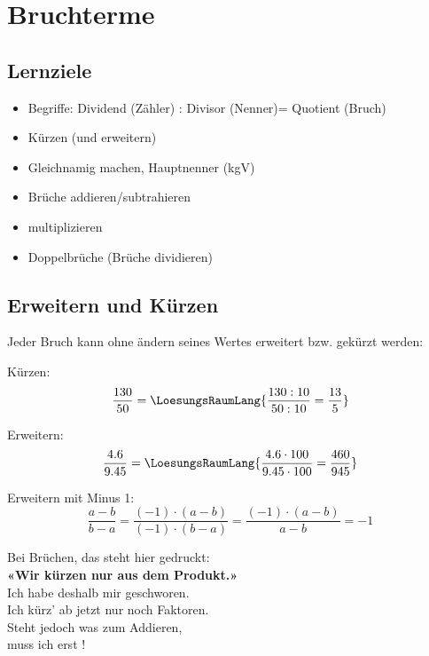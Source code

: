 \newpage
\section{Bruchterme}

\subsection*{Lernziele}

\begin{itemize}
	\item Begriffe: Dividend (Zähler) : Divisor
	(Nenner)= Quotient (Bruch)
  \item Kürzen (und erweitern)
	\item Gleichnamig machen, Hauptnenner (kgV)
	\item Brüche addieren/subtrahieren
  \item multiplizieren
	\item Doppelbrüche (Brüche dividieren) 
\end{itemize}

\newpage

\subsection{Erweitern und Kürzen}
Jeder Bruch kann ohne ändern seines Wertes erweitert bzw. gekürzt
werden:

Kürzen:
$$\frac{130}{50} = \LoesungsRaumLang{\frac{130 : 10}{50:10} =\frac{13}{5}}$$

Erweitern:
$$\frac{4.6}{9.45} = \LoesungsRaumLang{\frac{4.6 \cdot{}100}{9.45\cdot{}100} =
\frac{460}{945}}$$

Erweitern mit Minus 1:
$$\frac{a-b}{b-a} = \frac{(-1)\cdot(a-b)}{(-1)\cdot(b-a)}
= \frac{(-1)\cdot(a-b)}{a-b} = -1$$

\begin{rezept}{}{}

\begin{center}Bei Brüchen, das steht hier gedruckt:\\
\textbf{«Wir kürzen nur aus dem Produkt.»}\\

Ich habe deshalb mir geschworen.\\
Ich kürz' ab jetzt nur noch Faktoren.\\

Steht jedoch was zum Addieren,\noTRAINER{\vspace{5mm}}\\
muss ich erst \noTRAINER{\hspace{5cm}}!\\
\end{center}
\end{rezept}

